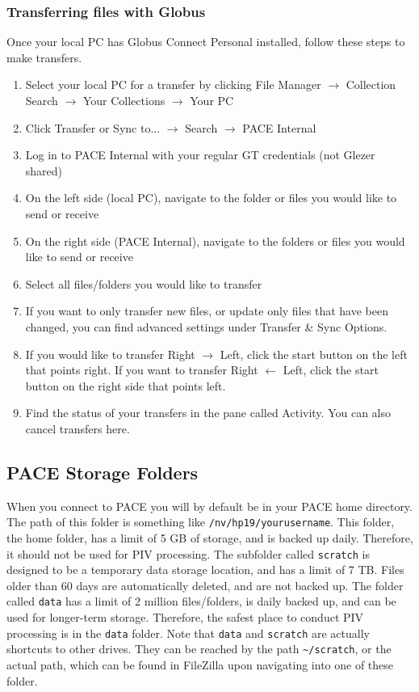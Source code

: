 \documentclass{article}
\begin{document}
	\subsubsection{Transferring files with Globus}
	Once your local PC has Globus Connect Personal installed, follow these steps to make transfers.
	\begin{enumerate}
	    \item Select your local PC for a transfer by clicking File Manager $\rightarrow$ Collection Search $\rightarrow$ Your Collections $\rightarrow$ Your PC
	    \item Click Transfer or Sync to... $\rightarrow$ Search $\rightarrow$ PACE Internal
	    \item Log in to PACE Internal with your regular GT credentials (not Glezer shared)
	    \item On the left side (local PC), navigate to the folder or files you would like to send or receive
	    \item On the right side (PACE Internal), navigate to the folders or files you would like to send or receive
	    \item Select all files/folders you would like to transfer
	    \item If you want to only transfer new files, or update only files that have been changed, you can find advanced settings under Transfer \& Sync Options.
	    \item If you would like to transfer Right $\rightarrow$ Left, click the start button on the left that points right.  If you want to transfer Right $\leftarrow$ Left, click the start button on the right side that points left.
	    \item Find the status of your transfers in the pane called Activity.  You can also cancel transfers here.
	    
	    
	\end{enumerate}
	
	\subsection{PACE Storage Folders}
	When you connect to PACE you will by default be in your PACE home directory.  The path of this folder is something like \nolinkurl{/nv/hp19/yourusername}.  This folder, the home folder, has a limit of 5 GB of storage, and is backed up daily.  Therefore, it should not be used for PIV processing.  The subfolder called \nolinkurl{scratch} is designed to be a temporary data storage location, and has a limit of 7 TB.  Files older than 60 days are automatically deleted, and are not backed up.  The folder called \nolinkurl{data} has a limit of 2 million files/folders, is daily backed up, and can be used for longer-term storage.  Therefore, the safest place to conduct PIV processing is in the \nolinkurl{data} folder.  Note that \nolinkurl{data} and \nolinkurl{scratch} are actually shortcuts to other drives.  They can be reached by the path \nolinkurl{~/scratch}, or the actual path, which can be found in FileZilla upon navigating into one of these folder.	
	
\end{document}
